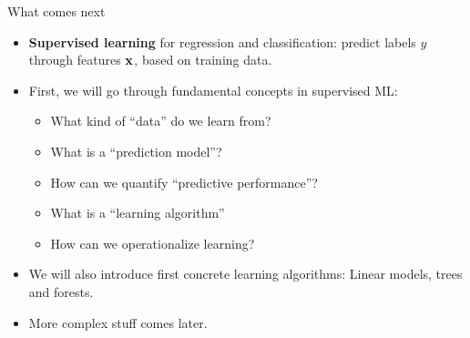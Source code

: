 \documentclass[11pt,compress,t,notes=noshow, xcolor=table]{beamer}
\begin{document}

\begin{frame}{What comes next}
  
  \begin{itemize}
    
    \item \textbf{Supervised learning} for regression 
    and classification: predict labels $y$ through features $\mathbf{x}$, based on training data.
    
    \item First, we will go through fundamental concepts in supervised ML: 
    \begin{itemize}
      
      \item What kind of ``data'' do we learn from?
      \item What is a ``prediction model''?
      \item How can we quantify ``predictive performance''?
      \item What is a ``learning algorithm'' 
      \item How can we operationalize learning?
      
    \end{itemize}
    
    \item We will also introduce first concrete learning algorithms: 
    Linear models, trees and forests. 
    
    \item More complex stuff comes later.
    
  \end{itemize}
  
\end{frame}



\endlecture
\end{document}
